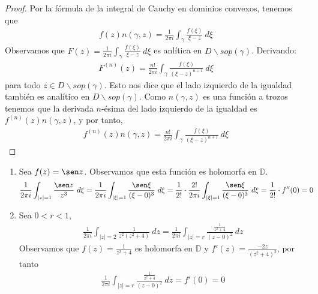 \begin{proof}
Por la fórmula de la integral de Cauchy en dominios convexos, tenemos que
\begin{align*}
    f(z)n(\gamma,z) = \frac{1}{2\pi i} \int_{\gamma} \frac{f(\xi)}{\xi - z} \ d\xi
\end{align*}
Observamos que $F(z) = \frac{1}{2\pi i} \int_{\gamma} \frac{f(\xi)}{\xi - z} \ d\xi$ es anlítica en $D \backslash sop(\gamma)$. Derivando:
\begin{align*}
    F^{(n)}(z) = \frac{n!}{2\pi i} \int_{\gamma} \frac{f(\xi)}{(\xi - z)^{n+1}} \ d\xi
\end{align*}
para todo $z \in D \backslash sop(\gamma)$. Esto nos dice que el lado izquierdo de la igualdad también es analítico en $D \backslash sop(\gamma)$. Como $n(\gamma,z)$ es una función a trozos tenemos que la derivada $n$-ésima del lado izquierdo de la igualdad es $f^{(n)}(z)n(\gamma,z)$, y
por tanto,
\begin{align*}
    f^{(n)}(z)n(\gamma,z) = \frac{n!}{2\pi i} \int_{\gamma} \frac{f(\xi)}{(\xi - z)^{n+1}} \ d\xi
\end{align*}
\end{proof}

\begin{ejemplo}
\begin{enumerate}
    \item Sea $f(z) = \sen z$. Observamos que esta función es holomorfa en $\mathbb{D}$.
    \begin{align*}
        \frac{1}{2\pi i} \int_{|z| = 1} \frac{\sen z}{z^3} \ d\xi &= \frac{1}{2\pi i}\int_{|\xi| = 1} \frac{\sen \xi}{(\xi - 0)^3} \ d\xi = \frac{1}{2!} \cdot \frac{2!}{2\pi i}\int_{|\xi| = 1} \frac{\sen \xi}{(\xi - 0)^3} \ d\xi =  \frac{1}{2!} \cdot f''(0) = 0
    \end{align*}
    \item Sea $0 < r < 1$,
    \begin{align*}
        \frac{1}{2\pi i}\int_{|z| = 2} \frac{1}{z^2(z^2 + 4)} \ dz = \frac{1}{2\pi i}\int_{|z| = r} \frac{\frac{1}{z^2+4}}{(z-0)^2} \ dz
    \end{align*}
    Observamos que $f(z) = \frac{1}{z^2 + 4}$ es holomorfa en $\mathbb{D}$ y $f'(z) = \frac{-2z}{(z^2+4)^2}$, por tanto
    \begin{align*}
        \frac{1}{2\pi i}\int_{|z| = r} \frac{\frac{1}{z^2+4}}{(z-0)^2} \ dz = f'(0) = 0
    \end{align*}
\end{enumerate}
\end{ejemplo}

